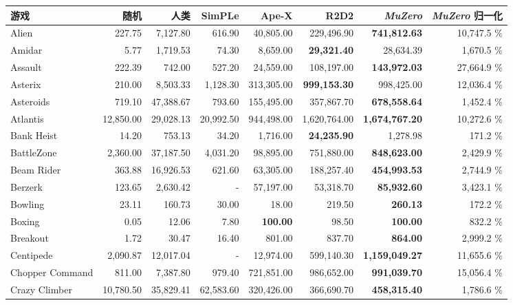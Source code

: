 \documentclass{article}
\newcommand{\muzero}{\emph{MuZero}}
\begin{document}
\begin{table}
\scriptsize

\begin{center}\begin{tabularx}{0.900000\textwidth}{X| r r r r r r r}
\toprule
游戏&随机&人类& SimPLe \cite{kaiser:simple} &Ape-X\cite{apex} & R2D2 \cite{r2d2} & \muzero{} & \muzero{} 归一化\\
\midrule
Alien&227.75 & 7,127.80 & 616.90 & 40,805.00 & 229,496.90 & \textbf{741,812.63} & 10,747.5 \%\\
Amidar&5.77 & 1,719.53 & 74.30 & 8,659.00 & \textbf{29,321.40} & 28,634.39 & 1,670.5 \%\\
Assault&222.39 & 742.00 & 527.20 & 24,559.00 & 108,197.00 & \textbf{143,972.03} & 27,664.9 \%\\
Asterix&210.00 & 8,503.33 & 1,128.30 & 313,305.00 & \textbf{999,153.30} & 998,425.00 & 12,036.4 \%\\
Asteroids&719.10 & 47,388.67 & 793.60 & 155,495.00 & 357,867.70 & \textbf{678,558.64} & 1,452.4 \%\\
Atlantis&12,850.00 & 29,028.13 & 20,992.50 & 944,498.00 & 1,620,764.00 & \textbf{1,674,767.20} & 10,272.6 \%\\
Bank Heist&14.20 & 753.13 & 34.20 & 1,716.00 & \textbf{24,235.90} & 1,278.98 & 171.2 \%\\
BattleZone&2,360.00 & 37,187.50 & 4,031.20 & 98,895.00 & 751,880.00 & \textbf{848,623.00} & 2,429.9 \%\\
Beam Rider&363.88 & 16,926.53 & 621.60 & 63,305.00 & 188,257.40 & \textbf{454,993.53} & 2,744.9 \%\\
Berzerk&123.65 & 2,630.42 & - & 57,197.00 & 53,318.70 & \textbf{85,932.60} & 3,423.1 \%\\
Bowling&23.11 & 160.73 & 30.00 & 18.00 & 219.50 & \textbf{260.13} & 172.2 \%\\
Boxing&0.05 & 12.06 & 7.80 & \textbf{100.00} & 98.50 & \textbf{100.00} & 832.2 \%\\
Breakout&1.72 & 30.47 & 16.40 & 801.00 & 837.70 & \textbf{864.00} & 2,999.2 \%\\
Centipede&2,090.87 & 12,017.04 & - & 12,974.00 & 599,140.30 & \textbf{1,159,049.27} & 11,655.6 \%\\
Chopper Command&811.00 & 7,387.80 & 979.40 & 721,851.00 & 986,652.00 & \textbf{991,039.70} & 15,056.4 \%\\
Crazy Climber&10,780.50 & 35,829.41 & 62,583.60 & 320,426.00 & 366,690.70 & \textbf{458,315.40} & 1,786.6 \%\\

\end{tabularx}
\end{center}
\end{table}
\end{document}
